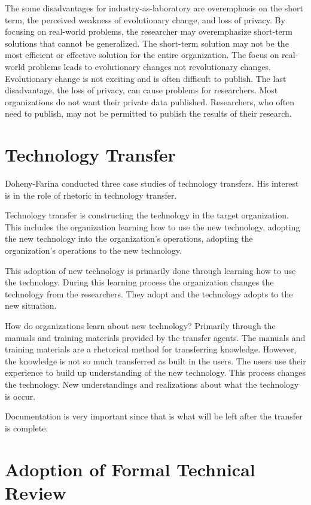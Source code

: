 The some disadvantages for industry-as-laboratory are overemphasis on the
short term, the perceived weakness of evolutionary change, and loss of
privacy.  By focusing on real-world problems, the researcher may
overemphasize short-term solutions that cannot be generalized. The
short-term solution may not be the most efficient or effective solution for
the entire organization.  The focus on real-world problems leads to
evolutionary changes not revolutionary changes.  Evolutionary change is not
exciting and is often difficult to publish.  The last disadvantage, the
loss of privacy, can cause problems for researchers.  Most organizations do
not want their private data published.  Researchers, who often need to
publish, may not be permitted to publish the results of their research.


\section{Technology Transfer}

Doheny-Farina conducted three case studies of technology transfers.  His
interest is in the role of rhetoric in technology transfer.     \cite{Doheny92} 

Technology transfer is constructing the technology in the target
organization.   This includes the organization learning how to use the new
technology, adopting the new technology into the organization's
operations, adopting the organization's operations to the new technology.  

This adoption of new technology is primarily done through learning how to
use the technology.  During this learning process the organization changes
the technology from the researchers.  They adopt and the technology adopts
to the new situation.

How do organizations learn about new technology?  Primarily through the
manuals and training materials provided by the transfer agents.  The
manuals and training materials are a rhetorical method for transferring
knowledge.  However, the knowledge is not so much transferred as built in
the users.  The users use their experience to build up understanding of the
new technology.  This process changes the technology.  New understandings
and realizations about what the technology is occur.

Documentation is very important since that is what will be left after the
transfer is complete.  




\section{Adoption of Formal Technical Review}

